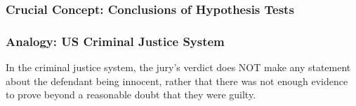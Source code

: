 \documentclass[slides]{beamer}
\newcommand{\blue}[1]{\textcolor{blue2}{#1}}
\begin{document}
\begin{frame}
\frametitle{Crucial Concept: Conclusions of Hypothesis Tests}

%
%
%
%

\end{frame}


\begin{frame}
\frametitle{Analogy:  US Criminal Justice System}

In the criminal justice system, the jury's verdict does NOT make any statement about the defendant being \blue{innocent}, rather that there was not enough evidence to prove beyond a reasonable doubt that they were guilty.

\end{frame}
\end{document}
